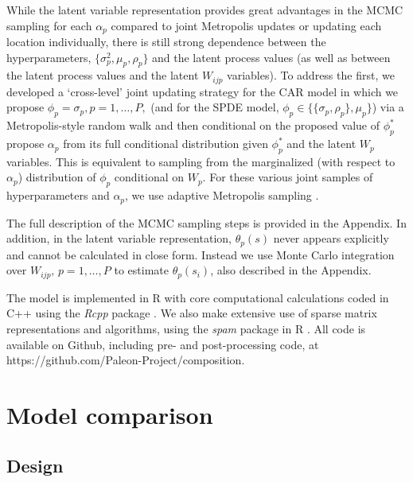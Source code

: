 \documentclass[12pt]{article}\usepackage[]{graphicx}\usepackage[]{color}
\begin{document}
While the latent variable representation provides great advantages
in the MCMC sampling for each $\alpha_{p}$ compared to joint Metropolis
updates or updating each location individually, there is still strong
dependence between the hyperparameters, $\{\sigma_{p}^{2},\mu_{p},\rho_{p}\}$
and the latent process values (as well as between the latent process
values and the latent $W_{ijp}$ variables). To address the first,
we developed a `cross-level' joint updating strategy for the CAR model
in which we propose $\phi_{p}=\sigma_{p},p=1,\ldots,P,$ (and for
the SPDE model, $\phi_{p}\in\{\{\sigma_{p},\rho_{p}\},\mu_{p}\}$)
via a Metropolis-style random walk and then conditional on the proposed
value of $\phi_{p}^{*}$ propose $\alpha_{p}$ from its full conditional
distribution given $\phi_{p}^{*}$ and the latent $W_{p}$ variables.
This is equivalent to sampling from the marginalized (with respect
to $\alpha_{p}$) distribution of $\phi_{p}$ conditional on $W_{p}$.
For these various joint samples of hyperparameters and $\alpha_{p}$,
we use adaptive Metropolis sampling \citep{Shab:Well:2011}.

The full description of the MCMC sampling steps is provided in the
Appendix. In addition, in the latent variable representation, $\theta_{p}(s)$
never appears explicitly and cannot be calculated in close form. Instead
we use Monte Carlo integration over $W_{ijp},\, p=1,\ldots,P$ to
estimate $\theta_{p}(s_{i})$, also described in the Appendix. 

The model is implemented in R \citep{R:2014} with core computational
calculations coded in C++ using the \emph{Rcpp} package \citep{Edde:Fran:2011}.
We also make extensive use of sparse matrix representations and algorithms,
using the \emph{spam} package in R \citep{Furr:Sain:2010}. All code
is available on Github, including pre- and post-processing code, at
https://github.com/Paleon-Project/composition. 


\section{Model comparison\label{sec:Model-comparison}}


\subsection{Design}
\end{document}

